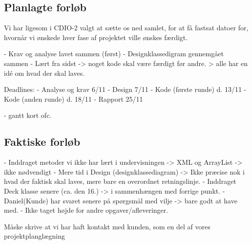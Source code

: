\documentclass[../main.tex]{subfiles}
\begin{document}
\subsection{Planlagte forløb}
\begin{flushleft}
Vi har ligesom i CDIO-2 valgt at sætte os ned samlet, for at få fastsat datoer for, hvornår vi ønskede hver fase af projektet ville ønskes færdigt.

   - Krav og analyse lavet sammen (først) \newline
   - Designklassedigram gennemgået sammen \newline
   - Lært fra sidst -> noget kode skal være færdigt før andre.\newline
   > alle har en idé om hvad der skal laves.\newline
  
   Deadlines: \newline
   - Analyse og krav  6/11 \newline
   - Design 7/11\newline
   - Kode (første runde) d. 13/11\newline %
   - Kode (anden runde) d. 18/11\newline
   - Rapport 25/11\newline
   
   - gantt kort ofc.
   
\end{flushleft}

\subsection{Faktiske forløb}
\begin{flushleft}
   - Inddraget metoder vi ikke har lært i undervisningen -> XML og ArrayList -> ikke nødvendigt \newline
   - Mere tid i Design (designklassediagram) -> Ikke præcise nok i hvad der faktisk skal laves, mere bare en overordnet retningslinje. \newline
   - Inddraget Deck klasse senere (ca. den 16.) -> i sammenhængen med forrige punkt. \newline
   - Daniel(Kunde) har svaret senere på spørgsmål med vilje -> bare godt at have med. \newline
   - Ikke taget højde for andre opgaver/afleveringer. \newline
\end{flushleft}

\todo Måske skrive at vi har haft kontakt med kunden, som en del af vores projektplanglægning
\end{document}
